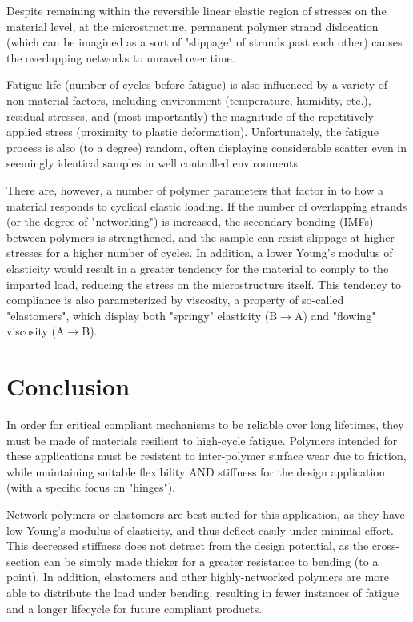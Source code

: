 \documentclass{report}
\begin{document}
Despite remaining within the reversible linear elastic region of stresses on the material level, 
at the microstructure, permanent polymer strand dislocation (which can be imagined as a sort of 
"slippage" of strands past each other) causes the overlapping networks to unravel over time.

Fatigue life (number of cycles before fatigue) is also influenced by a variety of non-material factors, including 
environment (temperature, humidity, etc.), residual stresses, and (most importantly) the magnitude 
of the repetitively applied stress (proximity to plastic deformation). Unfortunately, the fatigue 
process is also (to a degree) random, often displaying considerable scatter even in seemingly 
identical samples in well controlled environments \cite{fatigue}.

There are, however, a number of polymer parameters that factor in to how a material responds to
cyclical elastic loading. If the number of overlapping strands (or the degree of "networking") is
increased, the secondary bonding (IMFs) between polymers is strengthened, and the sample can resist
slippage at higher stresses for a higher number of cycles. In addition, a lower Young's modulus of
elasticity would result in a greater tendency for the material to comply to the imparted load, reducing
the stress on the microstructure itself. This tendency to compliance is also parameterized by viscosity,
a property of so-called "elastomers", which display both "springy" elasticity (B$\to$A) and "flowing" viscosity (A$\to$B).

\section{Conclusion}

In order for critical compliant mechanisms to be reliable over long lifetimes, they must be made of 
materials resilient to high-cycle fatigue. Polymers intended for these applications must be resistent 
to inter-polymer surface wear due to friction, while maintaining suitable flexibility AND stiffness for the design 
application (with a specific focus on "hinges").

Network polymers or elastomers are best suited for this application, as they have low Young's modulus of elasticity,
and thus deflect easily under minimal effort. This decreased stiffness does not detract from the design potential, as the cross-section
can be simply made thicker for a greater resistance to bending (to a point). In addition, elastomers and other highly-networked polymers
are more able to distribute the load under bending, resulting in fewer instances of fatigue and a longer lifecycle for future
compliant products.

\pagebreak




\end{document}
